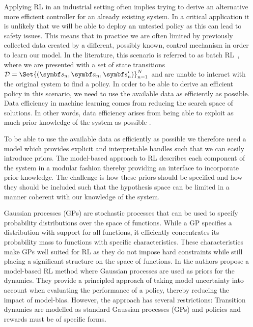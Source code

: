 Applying RL in an industrial setting often implies trying to derive an alternative more efficient controller for an already existing system.
In a critical application it is unlikely that we will be able to deploy an untested policy as this can lead to safety issues.
This means that in practice we are often limited by previously collected data created by a different, possibly known, control mechanism in order to learn our model.
In the literature, this scenario is referred to as batch RL~\parencite{lange_batch_2012}, where we are presented with a set of state transitions $\Dc = \Set{(\mat{s}_n, \mat{a}_n, \mat{s}_n^\prime)}_{n=1}^N$ and are unable to interact with the original system to find a policy.
In order to be able to derive an efficient policy in this scenario, we need to use the available data as efficiently as possible.
Data efficiency in machine learning comes from reducing the search space of solutions.
In other words, data efficiency arises from being able to exploit as much prior knowledge of the system as possible \parencite{shalev-shwartz_understanding_2014}.

To be able to use the available data as efficiently as possible we therefore need a model which provides explicit and interpretable handles such that we can easily introduce priors.
The model-based approach to RL describes each component of the system in a modular fashion thereby providing an interface to incorporate prior knowledge.
The challenge is how these priors should be specified and how they should be included such that the hypothesis space can be limited in a manner coherent with our knowledge of the system.

Gaussian processes (GPs) are stochastic processes that can be used to specify probability distributions over the space of functions.
While a GP specifies a distribution with support for all functions, it efficiently concentrates its probability mass to functions with specific characteristics.
These characteristics make GPs well suited for RL as they do not impose hard constraints while still placing a significant structure on the space of functions.
In \parencite{deisenroth_pilco_2011} the authors propose a model-based RL method where Gaussian processes are used as priors for the dynamics.
They provide a principled approach of taking model uncertainty into account when evaluating the performance of a policy, thereby reducing the impact of model-bias.
However, the approach has several restrictions:
Transition dynamics are modelled as standard Gaussian processes (GPs) and policies and rewards must be of specific forms.


